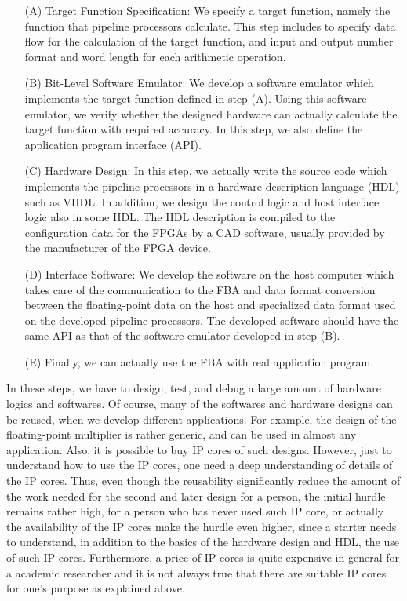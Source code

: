 \documentclass{llncs}
\begin{document}
\begin{itemize}
\setlength{\itemsep}{6pt}

\item[(A)] Target Function Specification:
We specify a target function, namely the function that pipeline
processors calculate. This step includes to specify 
data flow for the calculation of the target function, 
and input and output number format and word length for each arithmetic operation. 

\item[(B)] Bit-Level Software Emulator:
We develop a software emulator which implements the target function
defined in step (A). Using this software emulator, we verify
whether the designed hardware can actually calculate the target
function with required accuracy. In this step, we also define the
application program interface (API). 

\item[(C)]  Hardware Design:
In this step, we actually write the source code which implements the
pipeline processors in a hardware description language (HDL) such as VHDL.
In addition, we design the control logic and host interface logic also
in some HDL. The HDL description is compiled to the configuration data
for the FPGAs by a CAD software, usually provided by the
manufacturer of the FPGA device.

\item[(D)] Interface Software:
We develop the software on the host computer which takes care of the
communication to the FBA and data format conversion between the
floating-point data on the host and specialized data format used on
the developed pipeline processors. The developed software should have
the same API as that of the software emulator developed in step (B).

\item[(E)] Finally, we can actually use the FBA with
real application program.
\end{itemize}

In these steps, we have to design, test, and debug a large amount of hardware logics
and softwares. Of course, many of the softwares and hardware designs can
be reused, when we develop different applications. For example, the
design of the floating-point multiplier is rather generic, and can be
used in almost any application. Also, it is possible to buy 
IP cores of such designs.
However, just to understand how to use the IP cores, one need a deep understanding
of details of the IP cores. Thus, even
though the reusability significantly reduce the amount of the work
needed for the second and later design for a person, the initial
hurdle remains rather high, for a person who has never used 
such IP core, or actually the availability of the IP cores make the hurdle
even higher, since a starter needs to understand, in addition to the
basics of the hardware design and HDL, the use of such IP cores.
Furthermore, a price of IP cores is quite expensive in general for a academic 
researcher and it is not always true that there are suitable IP cores
for one's purpose as explained above.
\end{document}
